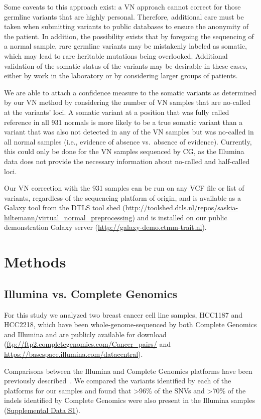 Some caveats to this approach exist: a VN approach cannot correct for those germline variants that are highly personal. Therefore, additional care must be taken when submitting variants to public databases to ensure the anonymity of the patient. In addition, the possibility exists that by foregoing the sequencing of a normal sample, rare germline variants may be mistakenly labeled as somatic, which may lead to rare heritable mutations being overlooked. Additional validation of the somatic status of the variants may be desirable in these cases, either by work in the laboratory or by considering larger groups of patients.

We are able to attach a confidence measure to the somatic variants as determined by our VN method by considering the number of VN samples that are no-called at the variants’ loci. A somatic variant at a position that was fully called reference in all 931 normals is more likely to be a true somatic variant than a variant that was also not detected in any of the VN samples but was no-called in all normal samples (i.e., evidence of absence vs.\ absence of evidence). Currently, this could only be done for the VN samples sequenced by CG, as the Illumina data does not provide the necessary information about no-called and half-called loci.

Our VN correction with the 931 samples can be run on any VCF file or list of variants, regardless of the sequencing platform of origin, and is available as a Galaxy tool from the DTLS tool shed (\url{http://toolshed.dtls.nl/repos/saskia-hiltemann/virtual\_normal\_preprocessing}) and is installed on our public demonstration Galaxy server (\url{http://galaxy-demo.ctmm-trait.nl}).

\section*{Methods}

\subsection*{Illumina vs. Complete Genomics}

For this study we analyzed two breast cancer cell line samples, HCC1187 and HCC2218, which have been whole-genome-sequenced by both Complete Genomics and Illumina and are publicly available for download (\url{ftp://ftp2.completegenomics.com/Cancer\_pairs/} and \url{https://basespace.illumina.com/datacentral}).

Comparisons between the Illumina and Complete Genomics platforms have been previously described~\cite{lam2012performance}. We compared the variants identified by each of the platforms for our samples and found that >96\% of the SNVs and >70\% of the indels identified by Complete Genomics were also present in the Illumina samples (\href{https://genome.cshlp.org/content/25/9/1382/suppl/DC1}{Supplemental Data S1}).

